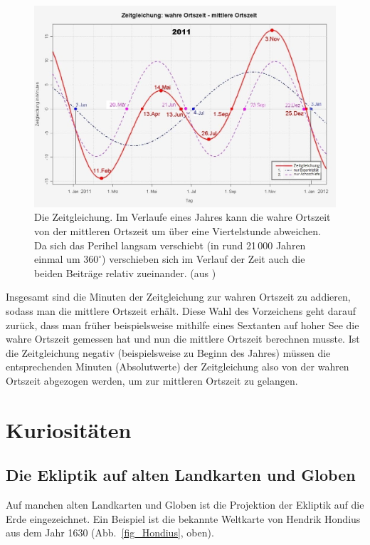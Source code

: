 \begin{figure}
\includegraphics[scale=0.36]{./Bilder/Zeitgleichung.jpg}
\caption{\label{fig_Zeitgleichung}%
Die Zeitgleichung. Im Verlaufe eines Jahres kann die wahre Ortszeit von der mittleren Ortszeit
um \"uber eine Viertelstunde abweichen. Da sich das Perihel langsam verschiebt (in rund 21\,000 Jahren
einmal um $360^\circ$) verschieben sich im Verlauf der Zeit auch die beiden Beitr\"age relativ zueinander.
(aus \cite{Wikipedia_Zeitgleichung})} 
\end{figure}

Insgesamt sind die Minuten der Zeitgleichung zur wahren Ortszeit zu addieren, sodass man die
mittlere Ortszeit erh\"alt. Diese Wahl des Vorzeichens geht darauf zur\"uck, dass man fr\"uher
beispielsweise mithilfe eines Sextanten auf hoher See die wahre Ortszeit gemessen hat
und nun die mittlere Ortszeit berechnen musste. 
Ist die Zeitgleichung negativ (beispielsweise zu Beginn des Jahres) m\"ussen die 
entsprechenden Minuten (Absolutwerte) der Zeitgleichung also von der wahren Ortszeit 
abgezogen werden, um zur mittleren Ortszeit zu gelangen. 

\section{Kuriosit\"aten}
\subsection{Die Ekliptik auf alten Landkarten und Globen}

Auf manchen alten Landkarten und Globen ist die Projektion der Ekliptik auf die
Erde eingezeichnet. Ein Beispiel ist die bekannte Weltkarte von 
Hendrik Hondius aus dem
Jahr 1630 (Abb.\ \ref{fig_Hondius}, oben).

